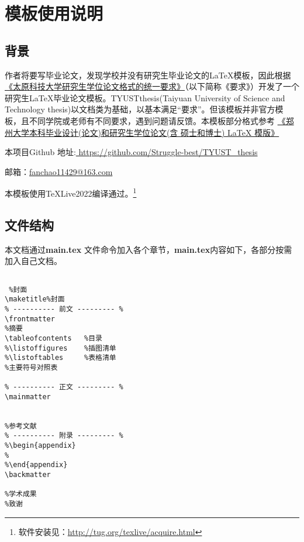 \linespread{1.55}\selectfont
\chapter{模板使用说明}
\section{背景}
作者将要写毕业论文，发现学校并没有研究生毕业论文的\LaTeX 模板，因此根据\href{https://yjsxy.tyust.edu.cn/info/1172/3275.html}{《太原科技大学研究生学位论文格式的统一要求》}（以下简称《要求》）开发了一个研究生\LaTeX 毕业论文模板。TYUSTthesis(Taiyuan University of Science and Technology thesis)以文档类为基础，以基本满足“要求”。但该模板并非官方模板，且不同学院或老师有不同要求，遇到问题请反馈。本模板部分格式参考
\href{https://github.com/tuxify/zzuthesis}{《郑州大学本科毕业设计(论文)和研究生学位论文(含 硕士和博士) LaTeX 模版》}

本项目Github 地址\faGithub :\href{https://github.com/Struggle-best/TYUST_thesis}{ \;\;https://github.com/Struggle-best/TYUST\_thesis}

邮箱：\href{fanchao11429@163.com}{fanchao11429@163.com}

本模板使用\TeX Live2022编译通过。\footnote{软件安装见：\url{http://tug.org/texlive/acquire.html}}
\section{文件结构}
本文档通过\textbf{main.tex} 文件\myverb{}命令加入各个章节，\textbf{main.tex}内容如下，各部分按需加入自己文档。

\begin{lstlisting}

 %封面
\maketitle%封面
% ---------- 前文 --------- %
\frontmatter
%摘要
\tableofcontents   %目录
%\listoffigures    %插图清单
%\listoftables     %表格清单
%主要符号对照表

% ---------- 正文 --------- %
\mainmatter


%参考文献
% ---------- 附录 --------- %
%\begin{appendix}
%	
%\end{appendix}
\backmatter

%学术成果
%致谢

\end{lstlisting}
